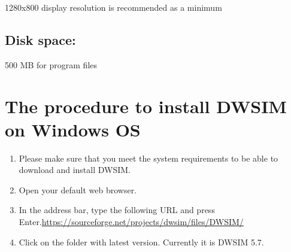 \documentclass[12pt,a4paper]{article}
\begin{document}
1280x800 display resolution is recommended as a minimum

\subsection*{Disk space:}	

500 MB for program files

\section{The procedure to install DWSIM on Windows OS}

\begin{enumerate}
\item Please make sure that you meet the system requirements to be able to download and install DWSIM.
\item Open your default web browser.
\item In the address bar, type the following URL and press Enter.\newline \url{https://sourceforge.net/projects/dwsim/files/DWSIM/}

\item Click on the folder with latest version. Currently it is DWSIM 5.7.


\end{enumerate}
\end{document}
